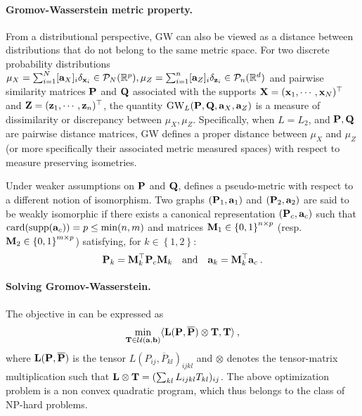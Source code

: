 \paragraph{Gromov-Wasserstein metric property.}
From a distributional perspective, GW can also be viewed as a distance between distributions that do not belong to the same metric space. For two discrete probability distributions $\mu_X = \sum_{i=1}^N [{\mathbf{a}}_X]_i \delta_{{\mathbf{x}}_i} \in {\mathcal{P}}_N(\mathbb{R}^{p}), \mu_Z =\sum_{i=1}^n [{\mathbf{a}}_Z]_i \delta_{{\mathbf{z}}_i} \in {\mathcal{P}}_n(\mathbb{R}^d)$ and pairwise similarity matrices ${\mathbf{P}}$ and ${\mathbf{Q}}$ associated with the supports ${\mathbf{X}} = ({\mathbf{x}}_1, \cdots, {\mathbf{x}}_N)^\top$ and ${\mathbf{Z}} = ({\mathbf{z}}_1, \cdots, {\mathbf{z}}_n)^\top$, the quantity $\operatorname{GW}_L ({\mathbf{P}}, {\mathbf{Q}}, {\mathbf{a}}_X, {\mathbf{a}}_Z)$ is a measure of dissimilarity or discrepancy between $\mu_X, \mu_Z$. Specifically, when $L=L_2$, and ${\mathbf{P}}, {\mathbf{Q}}$ are pairwise distance matrices, GW defines a proper distance between $\mu_X$ and $\mu_Z$ (or more specifically their associated metric measured spaces) with respect to measure preserving isometries.

\begin{remark}
    Under weaker assumptions on ${\mathbf{P}}$ and ${\mathbf{Q}}$,  defines a pseudo-metric with respect to a different notion of isomorphism. Two graphs $({\mathbf{P}}_1, {\mathbf{a}}_1)$ and $({\mathbf{P}}_2, {\mathbf{a}}_2)$ are said to be weakly isomorphic \citep{chowdhury2019gromov} if there exists a canonical representation $({\mathbf{P}}_c, {\mathbf{a}}_c)$ such that $\operatorname{card}(\operatorname{supp}({\mathbf{a}}_c)) = p \leq \min(n, m)$ and matrices ${\mathbf{M}}_1 \in \left\{0,1 \right\}^{n \times p}$ (resp. ${\mathbf{M}}_2 \in \left\{0,1 \right\}^{m \times p}$) satisfying, for $k \in \left\{1, 2\right\}$:
    \begin{equation}
        {\mathbf{P}}_k = {\mathbf{M}}_k^\top {\mathbf{P}}_c {\mathbf{M}}_k \quad \text{and} \quad {\mathbf{a}}_k = {\mathbf{M}}_k^\top {\mathbf{a}}_c \:.
    \end{equation}
\end{remark}


\paragraph{Solving Gromov-Wasserstein.} The objective in  can be expressed as 
\begin{align}
    \min_{{\mathbf{T}} \in {\mathcal{U}}({\mathbf{a}}, {\mathbf{b}})} \langle {\mathbf{L}}({\mathbf{P}}, \overline{{\mathbf{P}}}) \otimes {\mathbf{T}}, {\mathbf{T}} \rangle \:,
\end{align}
where ${\mathbf{L}}({\mathbf{P}}, \overline{{\mathbf{P}}})$ is the tensor $L(P_{ij}, \overline{P}_{kl})_{ijkl}$ and $\otimes$ denotes the tensor-matrix multiplication such that ${\mathbf{L}} \otimes {\mathbf{T}} = (\sum_{kl} L_{ijkl} T_{kl})_{ij}$. The above optimization problem is a non convex quadratic program, which thus belongs to the class of NP-hard problems. 

